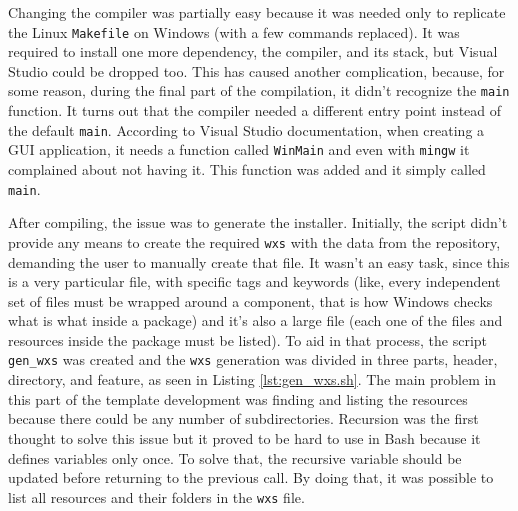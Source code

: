 Changing the compiler was partially easy because it was needed only to replicate the Linux \texttt{Makefile} on Windows (with a few commands replaced). It was required to install one more dependency, the compiler, and its stack, but Visual Studio could be dropped too. This has caused another complication, because, for some reason, during the final part of the compilation, it didn't recognize the \texttt{main} function. It turns out that the compiler needed a different entry point instead of the default \texttt{main}. According to Visual Studio documentation, when creating a GUI application, it needs a function called \texttt{WinMain} \cite{visualstudio2017entrypoint} and even with \texttt{mingw} it complained about not having it. This function was added and it simply called \texttt{main}.

After compiling, the issue was to generate the installer. Initially, the script didn't provide any means to create the required \texttt{wxs} with the data from the repository, demanding the user to manually create that file. It wasn't an easy task, since this is a very particular file, with specific tags and keywords (like, every independent set of files must be wrapped around a component, that is how Windows checks what is what inside a package) and it's also a large file (each one of the files and resources inside the package must be listed). To aid in that process, the script \texttt{gen\_wxs} was created and the \texttt{wxs} generation was divided in three parts, header, directory, and feature, as seen in Listing \ref{lst:gen_wxs.sh}. The main problem in this part of the template development was finding and listing the resources because there could be any number of subdirectories. Recursion was the first thought to solve this issue but it proved to be hard to use in Bash because it defines variables only once. To solve that, the recursive variable should be updated before returning to the previous call. By doing that, it was possible to list all resources and their folders in the \texttt{wxs} file.


